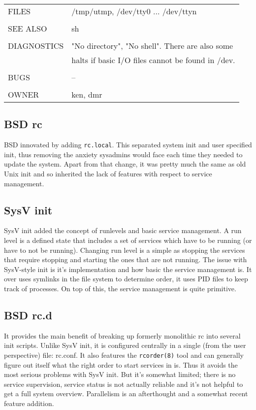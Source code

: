 \documentclass{article}
\newenvironment{manpage}{\ttfamily}{\par}
\begin{document}
\begin{manpage}
\begin{longtable}{ll}
		FILES & /tmp/utmp, /dev/tty0 ... /dev/ttyn\\\\
		
		SEE ALSO & sh\\\\
		
		DIAGNOSTICS & "No directory", "No shell". There are also some\\
		& halts if basic I/O files cannot be found in /dev.\\\\
		
		BUGS & --\\\\
		
		OWNER & ken, dmr
	\end{longtable}

\end{manpage}



\subsection{BSD rc}
BSD innovated by adding \texttt{rc.local}. This separated system init and user specified
init, thus removing the anxiety sysadmins would face each time they needed to update the
system. Apart from that change, it was pretty much the same as old Unix init
and so inherited the lack of features with respect to service management.


\subsection{SysV init}
SysV init added the concept of runlevels and basic 
service management. A run level is a defined state that includes
a set of services which have to be running (or have to not be running). Changing run level
is a simple as stopping the services that require stopping and starting the ones
that are not running. The issue with SysV-style init is it's implementation and
how basic the service management is. It over uses symlinks in the file system to determine order,
it uses PID files to keep track of processes. On top of this, the service management is
quite primitive.

\subsection{BSD rc.d}
It provides the main benefit of breaking up formerly monolithic rc into several
init scripts. Unlike SysV init, it is configured centrally in a single (from the user
perspective) file: rc.conf. It also features the \texttt{rcorder(8)} tool and can generally
figure out itself what the right order to start services in is. Thus it avoids the most
serious problems with SysV init. But it's somewhat limited;
there is no service supervision, service status is not actually reliable and it's not helpful
to get a full system overview. Parallelism is an afterthought and a somewhat recent feature
addition.
\end{document}
